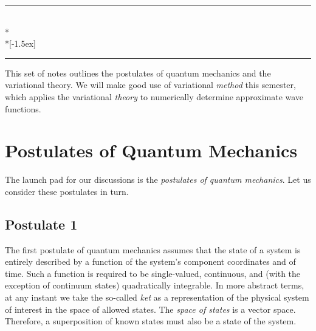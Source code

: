 \setcounter{chapter}{1}
\setcounter{section}{0}
\setlength{\parindent}{1em}
%
\let\originalleft\left
\let\originalright\right
\renewcommand{\left}{\mathopen{}\mathclose\bgroup\originalleft}
\renewcommand{\right}{\aftergroup\egroup\originalright}
%
\newcommand*{\qedfilled}{\hfill\ensuremath{\blacksquare}\\\rule{\textwidth}{0.4pt}}%
  {\topsep}%
  {\topsep}%
  {}%
  {}%
  {\bfseries}%
  {}%
  {\newline}%
  {\rule{\textwidth}{0.4pt}\\*%
   ~\\*[-1.5ex]%
   \rule{\textwidth}{0.4pt}%
  }%
%
\theoremstyle{hphstyle}
\newtheorem{hphproof}{Proof}[chapter]
%

\makeheaderfooter{}
\maketitle
%
%
This set of notes outlines the postulates of quantum mechanics and the variational theory. We will make good use of variational \emph{method} this semester, which applies the variational \emph{theory} to numerically determine approximate wave functions.

%
\section{Postulates of Quantum Mechanics}
The launch pad for our discussions is the \emph{postulates of quantum mechanics}. Let us consider these postulates in turn.

%
\subsection{Postulate 1}
The first postulate of quantum mechanics assumes that the state of a system
is entirely described by a function of the system's component coordinates
and of time. Such a function is required to be single-valued, continuous,
and (with the exception of continuum states) quadratically integrable. In
more abstract terms, at any instant we take the so-called \emph{ket}
\ket{\Psi} as a representation of the physical system of interest in the
space of allowed states. The \emph{space of states} is a vector space.
Therefore, a superposition of known states must also be a state of the
system.

